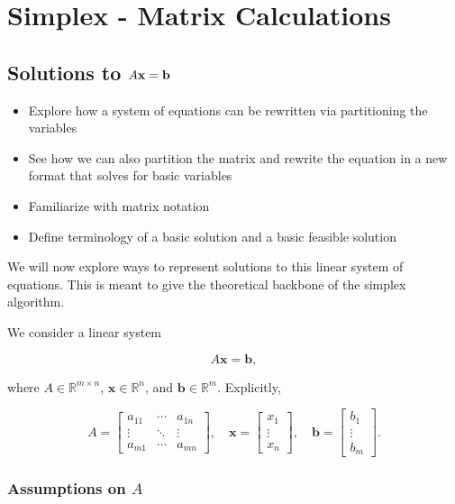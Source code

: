 \chapter{Simplex - Matrix Calculations}

\section{Solutions to $A\mathbf{x} = \mathbf{b}$}
\begin{outcome}
\begin{itemize}
\item Explore how a system of equations can be rewritten via partitioning the variables
\item See how we can also partition the matrix and rewrite the equation in a new format that solves for basic variables
\item Familiarize with matrix notation
\item Define terminology of a basic solution and a basic feasible solution
\end{itemize}
\end{outcome}
We will now explore ways to represent solutions to this linear system of equations.  This is meant to give the theoretical backbone of the simplex algorithm.  

We consider a linear system

$$
A \mathbf{x} = \mathbf{b},
$$

where $A \in \mathbb{R}^{m \times n}$, $\mathbf{x} \in \mathbb{R}^n$, and $\mathbf{b} \in \mathbb{R}^m$. Explicitly,

$$
A =
\begin{bmatrix}
    a_{11} & \cdots & a_{1n} \\
    \vdots & \ddots & \vdots \\
    a_{m1} & \cdots & a_{mn}
\end{bmatrix}, \quad
\mathbf{x} =
\begin{bmatrix}
    x_1 \\
    \vdots \\
    x_n
\end{bmatrix}, \quad
\mathbf{b} =
\begin{bmatrix}
    b_1 \\
    \vdots \\
    b_m
\end{bmatrix}.
$$

\subsection*{Assumptions on $A$}


